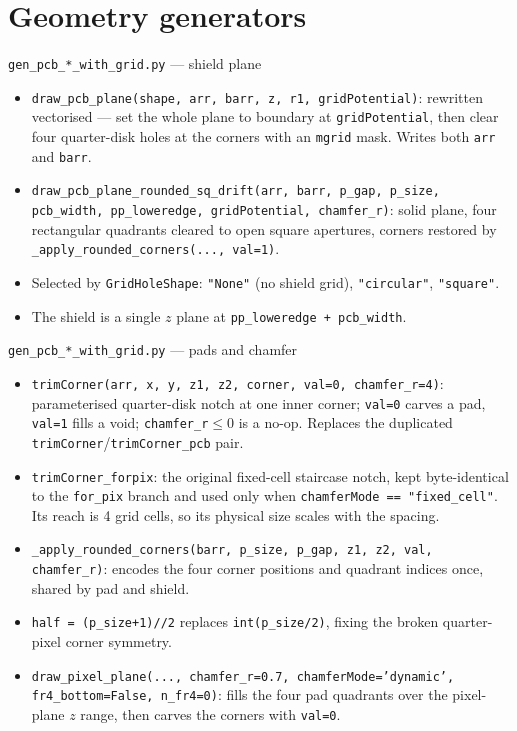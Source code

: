 \documentclass[10pt,aspectratio=169]{beamer}
\newcommand{\ti}[1]{\texttt{\footnotesize #1}}
\begin{document}
\section{Geometry generators}

\begin{frame}{\texttt{gen\_pcb\_*\_with\_grid.py} --- shield plane}
  \begin{itemize}\small
  \item \ti{draw\_pcb\_plane(shape, arr, barr, z, r1, gridPotential)}: rewritten
        vectorised --- set the whole plane to boundary at \ti{gridPotential}, then clear
        four quarter-disk holes at the corners with an \ti{mgrid} mask. Writes both
        \ti{arr} and \ti{barr}.
  \item \ti{draw\_pcb\_plane\_rounded\_sq\_drift(arr, barr, p\_gap, p\_size, pcb\_width,
        pp\_loweredge, gridPotential, chamfer\_r)}: solid plane, four rectangular quadrants
        cleared to open square apertures, corners restored by
        \ti{\_apply\_rounded\_corners(..., val=1)}.
  \item Selected by \ti{GridHoleShape}: \ti{"None"} (no shield grid), \ti{"circular"},
        \ti{"square"}.
  \item The shield is a single $z$ plane at \ti{pp\_loweredge + pcb\_width}.
  \end{itemize}
\end{frame}

\begin{frame}[allowframebreaks]{\texttt{gen\_pcb\_*\_with\_grid.py} --- pads and chamfer}
  \begin{itemize}\small
  \item \ti{trimCorner(arr, x, y, z1, z2, corner, val=0, chamfer\_r=4)}: parameterised
        quarter-disk notch at one inner corner; \ti{val=0} carves a pad, \ti{val=1} fills a
        void; \ti{chamfer\_r}$\le0$ is a no-op. Replaces the duplicated
        \ti{trimCorner}/\ti{trimCorner\_pcb} pair.
  \item \ti{trimCorner\_forpix}: the original fixed-cell staircase notch, kept
        byte-identical to the \ti{for\_pix} branch and used only when
        \ti{chamferMode == "fixed\_cell"}. Its reach is 4 grid cells, so its physical size
        scales with the spacing.
  \item \ti{\_apply\_rounded\_corners(barr, p\_size, p\_gap, z1, z2, val, chamfer\_r)}:
        encodes the four corner positions and quadrant indices once, shared by pad and
        shield.
  \item \ti{half = (p\_size+1)//2} replaces \ti{int(p\_size/2)}, fixing the broken
        quarter-pixel corner symmetry.
  \item \ti{draw\_pixel\_plane(..., chamfer\_r=0.7, chamferMode='dynamic', fr4\_bottom=False,
        n\_fr4=0)}: fills the four pad quadrants over the pixel-plane $z$ range, then carves
        the corners with \ti{val=0}.
  \end{itemize}
\end{frame}
\end{document}
